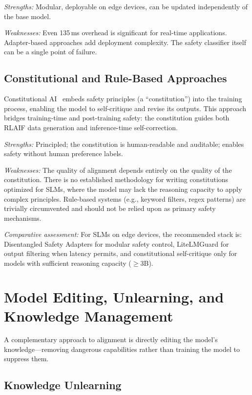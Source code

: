 \documentclass[12pt,a4paper]{article}
\begin{document}
\emph{Strengths:} Modular, deployable on edge devices, can be updated independently of the base model.

\emph{Weaknesses:} Even 135\,ms overhead is significant for real-time applications. Adapter-based approaches add deployment complexity. The safety classifier itself can be a single point of failure.

\subsection{Constitutional and Rule-Based Approaches}

Constitutional AI~\citep{bai2022constitutional} embeds safety principles (a ``constitution'') into the training process, enabling the model to self-critique and revise its outputs. This approach bridges training-time and post-training safety: the constitution guides both RLAIF data generation and inference-time self-correction.

\emph{Strengths:} Principled; the constitution is human-readable and auditable; enables safety without human preference labels.

\emph{Weaknesses:} The quality of alignment depends entirely on the quality of the constitution. There is no established methodology for writing constitutions optimized for SLMs, where the model may lack the reasoning capacity to apply complex principles. Rule-based systems (e.g., keyword filters, regex patterns) are trivially circumvented and should not be relied upon as primary safety mechanisms.

\emph{Comparative assessment:} For SLMs on edge devices, the recommended stack is: Disentangled Safety Adapters for modular safety control, LiteLMGuard for output filtering when latency permits, and constitutional self-critique only for models with sufficient reasoning capacity ($\geq$3B).

\section{Model Editing, Unlearning, and Knowledge Management}\label{sec:editing}

A complementary approach to alignment is directly editing the model's knowledge---removing dangerous capabilities rather than training the model to suppress them.

\subsection{Knowledge Unlearning}
\end{document}
